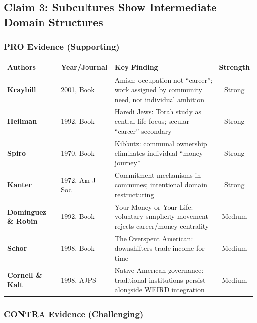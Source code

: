 \subsection{Claim 3: Subcultures Show Intermediate Domain Structures}

\subsubsection{PRO Evidence (Supporting)}

\begin{center}
\scriptsize
\begin{longtable}{@{}p{3cm}p{2cm}p{6cm}c@{}}
\toprule
\textbf{Authors} & \textbf{Year/Journal} & \textbf{Key Finding} & \textbf{Strength} \\
\midrule
\endfirsthead
\bottomrule
\endlastfoot
\textbf{Kraybill} & 2001, Book & Amish: occupation not ``career''; work assigned by community need, not individual ambition & Strong \\
\textbf{Heilman} & 1992, Book & Haredi Jews: Torah study as central life focus; secular ``career'' secondary & Strong \\
\textbf{Spiro} & 1970, Book & Kibbutz: communal ownership eliminates individual ``money journey'' & Strong \\
\textbf{Kanter} & 1972, Am J Soc & Commitment mechanisms in communes; intentional domain restructuring & Strong \\
\textbf{Dominguez \& Robin} & 1992, Book & Your Money or Your Life: voluntary simplicity movement rejects career/money centrality & Medium \\
\textbf{Schor} & 1998, Book & The Overspent American: downshifters trade income for time & Medium \\
\textbf{Cornell \& Kalt} & 1998, AJPS & Native American governance: traditional institutions persist alongside WEIRD integration & Medium \\
\end{longtable}
\end{center}

\subsubsection{CONTRA Evidence (Challenging)}

